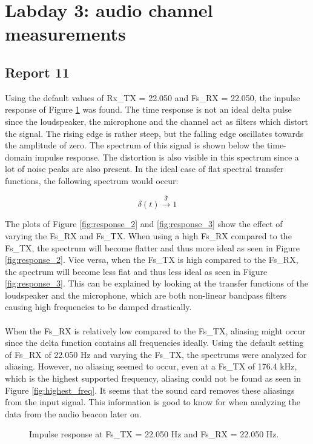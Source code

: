 \documentclass[final]{scrreprt} %
\begin{document}
\section{Labday 3: audio channel measurements}
\subsection{Report 11}
Using the default values of Rx\_TX = 22.050 and Fs\_RX = 22.050, the inpulse response of Figure \ref{fig:response_1} was found. The time response is not an ideal delta pulse since the loudspeaker, the microphone and the channel act as filters which distort the signal.
The rising edge is rather steep, but the falling edge oscillates towards the amplitude of zero.
The spectrum of this signal is shown below the time-domain impulse response.
The distortion is also visible in this spectrum since a lot of noise peaks are also present.
In the ideal case of flat spectral transfer functions, the following spectrum would occur:

\begin{equation}
	\delta(t) \xrightarrow{\mathfrak{F}} 1
\end{equation}

The plots of Figure \ref{fig:response_2} and \ref{fig:response_3} show the effect of varying the Fs\_RX and Fs\_TX.
When using a high Fs\_RX compared to the Fs\_TX, the spectrum will become flatter and thus more ideal as seen in Figure \ref{fig:response_2}.
Vice versa, when the Fs\_TX is high compared to the Fs\_RX, the spectrum will become less flat and thus less ideal as seen in Figure \ref{fig:response_3}.
This can be explained by looking at the transfer functions of the loudspeaker and the microphone, which are both non-linear bandpass filters causing high frequencies to be damped drastically.
\\ \\
When the Fs\_RX is relatively low compared to the Fs\_TX, aliasing might occur since the delta function contains all frequencies ideally.
Using the default setting of Fs\_RX of 22.050 Hz and varying the Fs\_TX, the spectrums were analyzed for aliasing.
However, no aliasing seemed to occur, even at a Fs\_TX of 176.4 kHz, which is the highest supported frequency, aliasing could not be found as seen in Figure \ref{fig:highest_freq}.
It seems that the sound card removes these aliasings from the input signal.
This information is good to know for when analyzing the data from the audio beacon later on.

\begin{figure}[H]
	\centering
	\setlength\figureheight{4cm}
    	\setlength{}
	
	\caption{Impulse response at Fs\_TX = 22.050 Hz and Fs\_RX = 22.050 Hz.}
	\label{fig:response_1}
\end{figure}
\end{document}
